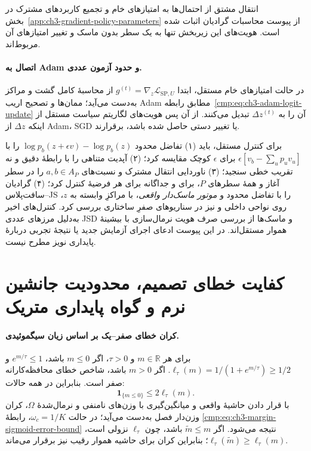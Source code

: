 انتقال مشتق از احتمال‌ها به امتیازهای خام
و تجمیع کاربردهای مشترک در
بخش~\ref{app:ch3-gradient-policy-parameters}
از پیوست محاسبات گرادیان اثبات شده است.
هویت‌های این زیربخش تنها به یک سطر بدون
ماسک و تغییر امتیازهای آن مربوط‌اند.

\paragraph{اتصال به Adam و حدود آزمون عددی.}
در حالت امتیازهای خام مستقل، ابتدا
$g^{(t)}=\nabla_z\mathcal L_{\mathrm{SP},U}$
از محاسبهٔ کامل گشت و مراکز به‌دست می‌آید؛
ممان‌ها و تصحیح اریب Adam مطابق
رابطه~\eqref{cmp:eq:ch3-adam-logit-update}
آن را به $\Delta z^{(t)}$ تبدیل می‌کنند.
از آن پس هویت‌های لگاریتم سیاست مستقل از
اینکه $\Delta z$ از Adam، SGD یا تغییر دستی
حاصل شده باشد، برقرارند.

برای کنترل مستقل، باید (۱) تفاضل محدود
$\log p_b(z+\epsilon v)-\log p_b(z)$ را با
$\epsilon[v_b-\sum_up_uv_u]$ برای $\epsilon$
کوچک مقایسه کرد؛ (۲) آپدیت متناهی را با
رابطهٔ دقیق و نه تقریب خطی سنجید؛
(۳) ناوردایی انتقال مشترک و نسبت‌های
$a,b\in A_P$ را در سطر آغاز و همهٔ سطرهای
$P$، برای  و جداگانه برای هر
فرضیهٔ  کنترل کرد؛
(۴) گرادیان سافت‌پلاس--JS را با تفاضل محدود
و  \emph{موتور ماسک‌دار واقعی}،
با مراکزِ وابسته به $z$، روی نواحی داخلی
و نیز در سناریوهای صفرِ ساختاری بررسی کرد.
کنترل‌های اخیر به‌دلیل مرزهای عددی JSD
و ماسک‌ها از بررسی صرف هویت نرمال‌سازی با بیشینهٔ هموار مستقل‌اند.
در این پیوست ادعای اجرای آزمایش جدید
یا نتیجهٔ تجربی دربارهٔ پایداری نویز مطرح نیست.

\section{کفایت خطای تصمیم، محدودیت جانشین نرم و گواه پایداری متریک}
\label{app:ch3-margin-robustness}

\paragraph{کران خطای صفر--یک بر اساس زیان سیگموئیدی.}
برای هر $m\in\mathbb R$ و $\tau>0$،
اگر $m\le0$ باشد،
$e^{m/\tau}\le1$ و
$\ell_\tau(m)=1/(1+e^{m/\tau})\ge1/2$.
اگر $m>0$ باشد،
شاخص خطای محافظه‌کارانه صفر است.
بنابراین در همه حالات:
\[
\mathbf1_{\{m\le0\}}\le2\ell_\tau(m).
\]
با قرار دادن حاشیهٔ واقعی و میانگین‌گیری با وزن‌های نامنفی و نرمال‌شدهٔ $\Omega$، کران وزن‌دار فصل به‌دست می‌آید؛ در حالت $\omega_c=1/K$، رابطهٔ
\eqref{cmp:eq:ch3-margin-sigmoid-error-bound}
نتیجه می‌شود. اگر
$\widetilde m\le m$ باشد،
چون $\ell_\tau$ نزولی است،
$\ell_\tau(\widetilde m)\ge\ell_\tau(m)$؛
بنابراین کران برای
حاشیه هموار رقیب نیز برقرار می‌ماند.

